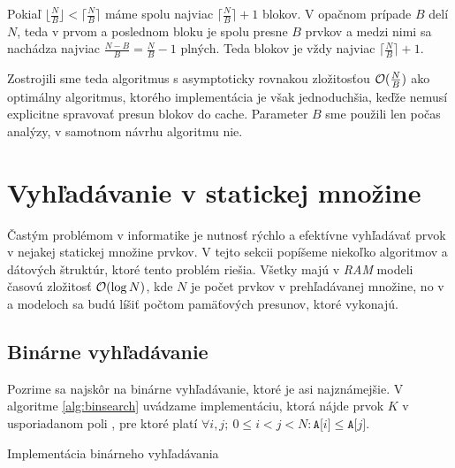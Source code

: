 Pokiaľ $\lfloor \frac{N}{B} \rfloor < \lceil \frac{N}{B} \rceil$ máme spolu najviac $\lceil \frac{N}{B} \rceil + 1$ blokov. V opačnom prípade $B$ delí $N$, teda v prvom a poslednom bloku je spolu presne $B$ prvkov a medzi nimi sa nachádza najviac $\frac{N-B}{B} = \frac{N}{B} - 1$ plných. Teda blokov je vždy najviac $\lceil \frac{N}{B} \rceil +1$.

Zostrojili sme teda \obliv algoritmus s asymptoticky rovnakou zložitosťou $\mathcal{O}(\frac{N}{B})$ ako optimálny \aware algoritmus, ktorého implementácia je však jednoduchšia, keďže nemusí explicitne spravovať presun blokov do cache. Parameter $B$ sme použili len počas analýzy, v samotnom návrhu algoritmu nie.

\section{Vyhľadávanie v statickej množine}
Častým problémom v informatike je nutnosť rýchlo a efektívne vyhľadávať prvok v nejakej statickej množine prvkov. V tejto sekcii popíšeme niekoľko algoritmov a dátových štruktúr, ktoré tento problém riešia. Všetky majú v \emph{RAM} modeli časovú zložitosť $\mathcal{O}(\log N)$, kde $N$ je počet prvkov v prehľadávanej množine, no v \aware a \obliv modeloch sa budú líšiť počtom pamäťových presunov, ktoré vykonajú.

\subsection{Binárne vyhľadávanie}
Pozrime sa najskôr na binárne vyhľadávanie, ktoré je asi najznámejšie. V algoritme \ref{alg:binsearch} uvádzame implementáciu, ktorá nájde prvok $K$ v usporiadanom poli , pre ktoré platí $\forall i,j;~ 0\le i < j < N: \texttt{A[}i\texttt{]} \le \texttt{A[}j\texttt{]}$.

\begin{algorithm}
    \caption{Implementácia binárneho vyhľadávania}
    \label{alg:binsearch}
    \begin{algorithmic}[1]
                    \State {}
                \Else
                \EndIf
            \EndWhile
            \State {}
        \EndFunction
    \end{algorithmic}
\end{algorithm}

